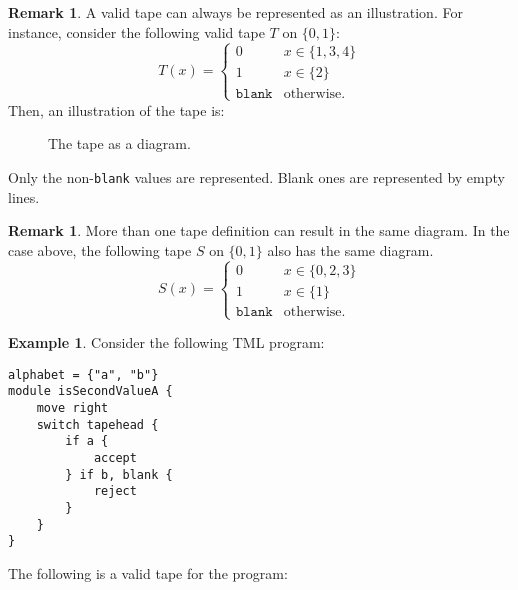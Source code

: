 \documentclass{article}
\theoremstyle{definition}
\newtheorem{remark}[rules]{Remark}
\newtheorem{example}[rules]{Example}
\begin{document}
    \begin{remark}
        A valid tape can always be represented as an illustration. For instance, consider the following valid tape $T$ on $\{0, 1\}$:
        \[T(x) = \begin{cases}
            0 & x \in \{1, 3, 4\} \\
            1 & x \in \{2\} \\
            \texttt{blank} & \text{otherwise}.
        \end{cases}\]
        Then, an illustration of the tape is:
        \begin{figure}[H]
            \centering
            \caption{The tape as a diagram.}
        \end{figure}
        \noindent Only the non-\texttt{blank} values are represented. Blank ones are represented by empty lines.
    \end{remark}
    \begin{remark}
        More than one tape definition can result in the same diagram. In the case above, the following tape $S$ on $\{0, 1\}$ also has the same diagram.
        \[S(x) = \begin{cases}
            0 & x \in \{0, 2, 3\} \\
            1 & x \in \{1\} \\
            \texttt{blank} & \text{otherwise}.
        \end{cases}\]        
    \end{remark}
    \begin{example}
Consider the following TML program:
\begin{lstlisting}[language=TML]
alphabet = {"a", "b"}
module isSecondValueA {
    move right
    switch tapehead {
        if a {
            accept
        } if b, blank {
            reject
        }
    }
}
\end{lstlisting}
    The following is a valid tape for the program:
    \begin{figure}[H]
        \centering
    \end{figure}
    \end{example}
\end{document}
